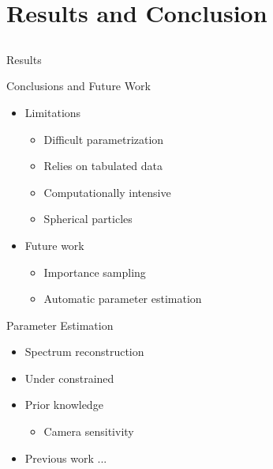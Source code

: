 \documentclass{beamer}
\begin{document}
\section{Results and Conclusion}
\subsection{ }

\begin{frame}{Results}

\end{frame}

\begin{frame}{Conclusions and Future Work}

\begin{itemize}
\setlength\itemsep{0.5em}
\item Limitations
	\begin{itemize}
	\setlength\itemsep{0.5em}
	\item Difficult parametrization
	\item Relies on tabulated data
	\item Computationally intensive
	\item Spherical particles
	\end{itemize}
\item Future work
	\begin{itemize}
	\setlength\itemsep{0.5em}
	\item Importance sampling
	\item Automatic parameter estimation
	\end{itemize}
\end{itemize}

\end{frame}

\begin{frame}{Parameter Estimation}

\begin{itemize}
\setlength\itemsep{0.5em}
\item Spectrum reconstruction
\item Under constrained
\item Prior knowledge
	\begin{itemize}
	\setlength\itemsep{0.5em}
	\item Camera sensitivity
	\end{itemize}
\item Previous work ...
\end{itemize}

\end{frame}
\end{document}
